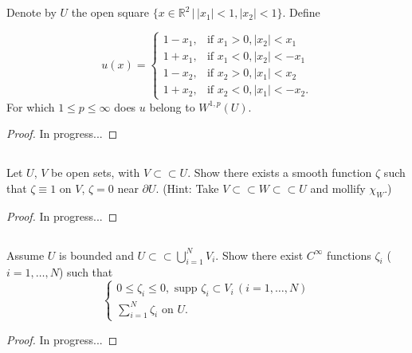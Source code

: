 \documentclass[11pt]{article}
\begin{document}
\newpage

\setcounter{subsection}{2}
\subsection{}
Denote by $U$ the open square $\{x \in \mathbb{R}^2 \, | \, |x_1| < 1, |x_2| < 1\}$. Define

\[
u(x) =
\begin{cases} 
	1 - x_1, & \text{if } x_1 > 0, |x_2| < x_1 \\
	1 + x_1, & \text{if } x_1 < 0, |x_2| < -x_1 \\
	1 - x_2, & \text{if } x_2 > 0, |x_1| < x_2 \\
	1 + x_2, & \text{if } x_2 < 0, |x_1| < -x_2.
\end{cases}
\]
For which $1 \leq p \leq \infty$ does $u$ belong to $W^{1,p}(U)$.
\begin{proof}
In progress...
\end{proof}

\setcounter{subsection}{4}
\subsection{}
Let $U$, $V$ be open sets, with $V\subset\subset U$. Show there exists a smooth function $\zeta$ such that
$\zeta \equiv 1$ on $V$, $\zeta = 0$ near $\partial U$. (Hint: Take $V \subset\subset W \subset\subset U$ and mollify $\chi_W$.)
\begin{proof}
In progress...
\end{proof}

\subsection{}
Assume $U$ is bounded and $U \subset\subset \bigcup_{i=1}^{N}V_i$. Show there exist $C^{\infty}$ functions $\zeta_i$ ($i=1,\dots,N$)
such that
\[
\begin{cases}
	0 \leq \zeta_i \leq 0, \text{ supp } \zeta_i \subset V_i \,(i=1,\dots,N)\\
	\sum_{i=1}^{N} \zeta_i \text{ on } U.
\end{cases}
\]
\begin{proof}
In progress...
\end{proof}
\end{document}
